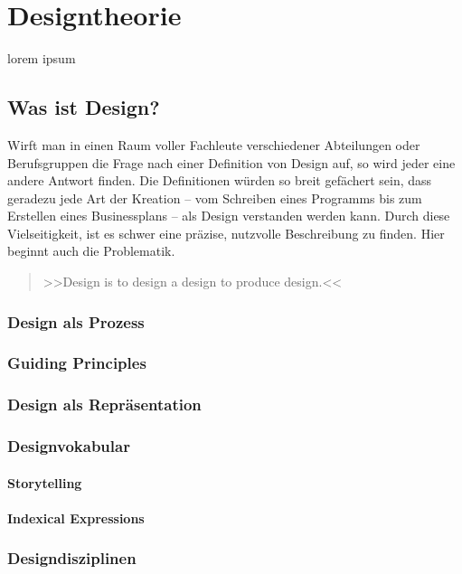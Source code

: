 \chapter{Designtheorie}\label{ch:designTheorie}

lorem ipsum

\section{Was ist Design?}
Wirft man in einen Raum voller Fachleute verschiedener Abteilungen oder Berufsgruppen die Frage nach einer Definition von Design auf, so wird jeder eine andere Antwort finden. Die Definitionen würden so breit gefächert sein, dass geradezu jede Art der Kreation – vom Schreiben eines Programms bis zum Erstellen eines Businessplans – als Design verstanden werden kann. Durch diese Vielseitigkeit, ist es schwer eine präzise, nutzvolle Beschreibung zu finden.  Hier beginnt auch die Problematik. \citep{sagmeister:2008}

\medskip \begin{quote}
{>>Design is to design a design to produce design.<<} 
\citep{heskett:2005} \end{quote}

\subsection{Design als Prozess}
\subsection{Guiding Principles}
\subsection{Design als Repräsentation}
\subsection{Designvokabular}
\subsubsection{Storytelling}
\subsubsection{Indexical Expressions}
\subsection{Designdisziplinen}

